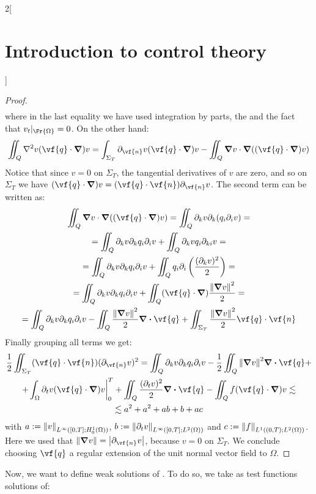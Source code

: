 \documentclass[../../../main_math.tex]{subfiles}
\begin{document}
\begin{multicols}{2}[\section{Introduction to control theory}]
\begin{proof}
\begin{multline*}
    \end{multline*}
    where in the last equality we have used integration by parts, the  and the fact that $v_t|_{\Fr{\Omega}}=0$. On the other hand:
    \begin{multline*}
      \iint_Q \laplacian v (\vf{q}\cdot \grad) v = \int_{\Sigma_T}\partial_{\vf{n}}v(\vf{q}\cdot \grad) v - \iint_Q \grad v \cdot \grad ((\vf{q}\cdot \grad) v)
    \end{multline*}
    Notice that since $v=0$ on $\Sigma_T$, the tangential derivatives of $v$ are zero, and so on $\Sigma_T$ we have $(\vf{q}\cdot \grad) v = (\vf{q}\cdot \vf{n})\partial_{\vf{n}}v$.
    The second term can be written as:
    \begin{multline*}
      \iint_Q \grad v \cdot \grad ((\vf{q}\cdot \grad) v) = \iint_Q\partial_kv\partial_k (q_i\partial_iv)=\\=\iint_Q\partial_kv\partial_kq_i \partial_iv + \iint_Q\partial_kvq_i\partial_{ki}v=\\= \iint_Q\partial_kv\partial_kq_i \partial_iv + \iint_Qq_i\partial_i\left(\frac{(\partial_kv)^2}{2}\right)=\\=
      \iint_Q\partial_kv\partial_kq_i \partial_iv + \iint_Q(\vf{q}\cdot \grad)\frac{\norm{\grad v}^2}{2}=\\= \iint_Q\partial_kv\partial_kq_i \partial_iv - \iint_Q\frac{\norm{\grad v}^2}{2}\div \vf{q}+\iint_{\Sigma_T}\frac{\norm{\grad v}^2}{2} \vf{q} \cdot \vf{n}
    \end{multline*}
    Finally grouping all terms we get:
    \begin{multline*}
      \frac{1}{2}\iint_{\Sigma_T} (\vf{q} \cdot \vf{n})(\partial_{\vf{n}}v)^2=\iint_Q\partial_kv\partial_kq_i \partial_iv -\frac{1}{2} \iint_Q \norm{\grad v}^2\div \vf{q} +\\+ \int_\Omega\partial_tv (\vf{q}\cdot \grad) v\bigg|_0^T + \iint_Q \frac{(\partial_t v)^2}{2} \div \vf{q} -\iint_Q f (\vf{q}\cdot \grad) v\lesssim\\ \lesssim a^2+a^2+ab+b+ac
    \end{multline*}
    with $a:=\norm{v}_{L^\infty([0,T]; H_0^1(\Omega))}$, $b:=\norm{\partial_t v}_{L^\infty([0,T]; L^2(\Omega))}$ and $c:=\norm{f}_{L^1((0,T); L^2(\Omega))}$. Here we used that $\norm{\grad v}=\abs{\partial_{\vf{n}}v}$, because $v=0$ on $\Sigma_T$.
    We conclude choosing $\vf{q}$ a regular extension of the unit normal vector field to $\Omega$.
  \end{proof}
  Now, we want to define weak solutions of . To do so, we take as test functions solutions of:

\end{multicols}
\end{document}
